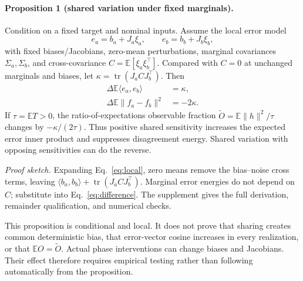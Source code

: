 \documentclass[10pt,twocolumn,letterpaper]{article}
\begin{document}
\paragraph{Proposition 1 (shared variation under fixed marginals).}
Condition on a fixed target and nominal inputs. Assume the local error model
\begin{equation}
e_a=b_a+J_a\xi_a,\qquad e_b=b_b+J_b\xi_b,\label{eq:local}
\end{equation}
with fixed biases/Jacobians, zero-mean perturbations, marginal covariances $\Sigma_a,\Sigma_b$, and cross-covariance $C=\mathbb E[\xi_a\xi_b^\top]$. Compared with $C=0$ at unchanged marginals and biases, let $\kappa=\operatorname{tr}(J_a C J_b^\top)$. Then
\begin{align}
\Delta\mathbb E\langle e_a,e_b\rangle&=\kappa,\\
\Delta\mathbb E\|f_a-f_b\|^2&=-2\kappa.\label{eq:covariance}
\end{align}
If $\tau=\mathbb E T>0$, the ratio-of-expectations observable fraction $\widetilde O=\mathbb E\|h\|^2/\tau$ changes by $-\kappa/(2\tau)$. Thus positive shared sensitivity increases the expected error inner product and suppresses disagreement energy. Shared variation with opposing sensitivities can do the reverse.

\emph{Proof sketch.} Expanding Eq.~\ref{eq:local}, zero means remove the bias--noise cross terms, leaving $\langle b_a,b_b\rangle+\operatorname{tr}(J_a C J_b^\top)$. Marginal error energies do not depend on $C$; substitute into Eq.~\ref{eq:difference}. The supplement gives the full derivation, remainder qualification, and numerical checks.

This proposition is conditional and local. It does not prove that sharing creates common deterministic bias, that error-vector cosine increases in every realization, or that $\mathbb E O=\widetilde O$. Actual phase interventions can change biases and Jacobians. Their effect therefore requires empirical testing rather than following automatically from the proposition.
\end{document}
